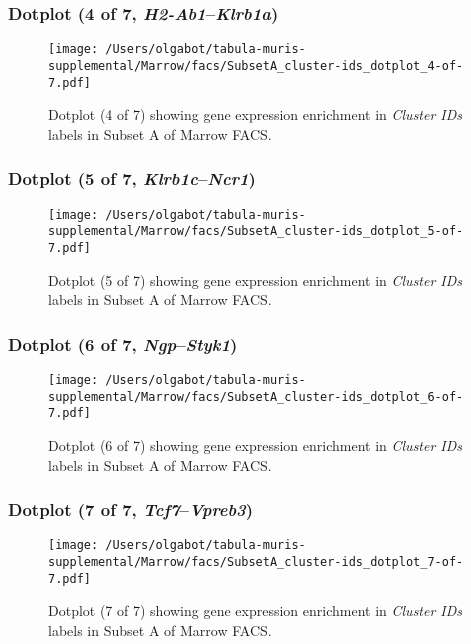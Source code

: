 \clearpage

\subsubsection{Dotplot (4 of 7, \emph{H2-Ab1}--\emph{Klrb1a})}
\begin{figure}[h]
\centering
\texttt{[image: /Users/olgabot/tabula-muris-supplemental/Marrow/facs/SubsetA\_cluster-ids\_dotplot\_4-of-7.pdf]}

\caption{ Dotplot (4 of 7)  showing gene expression enrichment in \emph{Cluster IDs} labels in Subset A of Marrow FACS. }
\end{figure}


\clearpage

\subsubsection{Dotplot (5 of 7, \emph{Klrb1c}--\emph{Ncr1})}
\begin{figure}[h]
\centering
\texttt{[image: /Users/olgabot/tabula-muris-supplemental/Marrow/facs/SubsetA\_cluster-ids\_dotplot\_5-of-7.pdf]}

\caption{ Dotplot (5 of 7)  showing gene expression enrichment in \emph{Cluster IDs} labels in Subset A of Marrow FACS. }
\end{figure}


\clearpage

\subsubsection{Dotplot (6 of 7, \emph{Ngp}--\emph{Styk1})}
\begin{figure}[h]
\centering
\texttt{[image: /Users/olgabot/tabula-muris-supplemental/Marrow/facs/SubsetA\_cluster-ids\_dotplot\_6-of-7.pdf]}

\caption{ Dotplot (6 of 7)  showing gene expression enrichment in \emph{Cluster IDs} labels in Subset A of Marrow FACS. }
\end{figure}


\clearpage

\subsubsection{Dotplot (7 of 7, \emph{Tcf7}--\emph{Vpreb3})}
\begin{figure}[h]
\centering
\texttt{[image: /Users/olgabot/tabula-muris-supplemental/Marrow/facs/SubsetA\_cluster-ids\_dotplot\_7-of-7.pdf]}

\caption{ Dotplot (7 of 7)  showing gene expression enrichment in \emph{Cluster IDs} labels in Subset A of Marrow FACS. }
\end{figure}


